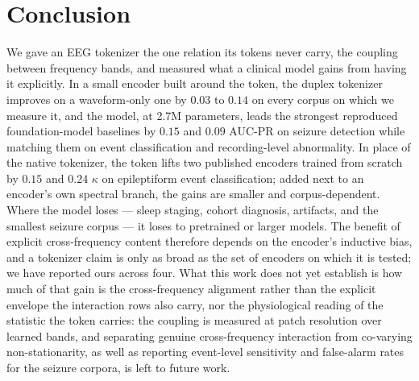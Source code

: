 \section{Conclusion}
\label{sec:conclusion}

We gave an EEG tokenizer the one relation its tokens never carry, the
coupling between frequency bands, and measured what a clinical model
gains from having it explicitly. In a small encoder built around the
token, the duplex tokenizer improves on a waveform-only one by $0.03$ to
$0.14$ on every corpus on which we measure it, and the model, at 2.7M parameters,
leads the strongest reproduced foundation-model baselines by $0.15$ and
$0.09$ AUC-PR on seizure detection while matching them on event
classification and recording-level abnormality. In place of the native
tokenizer, the token lifts two published encoders trained from scratch
by $0.15$ and $0.24$ $\kappa$ on epileptiform event classification; added
next to an encoder's own spectral branch, the gains are smaller and
corpus-dependent. Where the model loses --- sleep staging, cohort
diagnosis, artifacts, and the smallest seizure corpus --- it loses to
pretrained or larger models. The benefit of explicit cross-frequency
content therefore depends on the encoder's inductive bias, and a
tokenizer claim is only as broad as the set of encoders on which it is
tested; we have reported ours across four. What this work does not yet
establish is how much of that gain is the cross-frequency alignment
rather than the explicit envelope the interaction rows also carry, nor
the physiological reading of the statistic the token carries: the coupling is measured at patch resolution over learned bands,
and separating genuine cross-frequency interaction from co-varying
non-stationarity, as well as reporting event-level sensitivity and
false-alarm rates for the seizure corpora, is left to future work.
